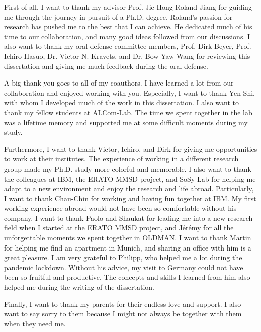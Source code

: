First of all, I want to thank my advisor Prof. Jie-Hong Roland Jiang for guiding me through the journey in pursuit of a Ph.D. degree.
Roland's passion for research has pushed me to the best that I can achieve.
He dedicated much of his time to our collaboration, and many good ideas followed from our discussions.
I also want to thank my oral-defense committee members,
Prof. Dirk Beyer, Prof. Ichiro Hasuo, Dr. Victor N. Kravets, and Dr. Bow-Yaw Wang
for reviewing this dissertation and giving me much feedback during the oral defense.

A big thank you goes to all of my coauthors.
I have learned a lot from our collaboration and enjoyed working with you.
Especially, I want to thank Yen-Shi, with whom I developed much of the work in this dissertation.
I also want to thank my fellow students at ALCom-Lab.
The time we spent together in the lab was a lifetime memory and supported me at some difficult moments during my study.

Furthermore, I want to thank Victor, Ichiro, and Dirk for giving me opportunities to work at their institutes.
The experience of working in a different research group made my Ph.D. study more colorful and memorable.
I also want to thank the colleagues at IBM, the ERATO MMSD project, and SoSy-Lab
for helping me adapt to a new environment and enjoy the research and life abroad.
Particularly, I want to thank Chau-Chin for working and having fun together at IBM.
My first working experience abroad would not have been so comfortable without his company.
I want to thank Paolo and Shaukat for leading me into a new research field when I started at the ERATO MMSD project,
and J{\'e}r{\'e}my for all the unforgettable moments we spent together in OLDMAN.
I want to thank Martin for helping me find an apartment in Munich, and sharing an office with him is a great pleasure.
I am very grateful to Philipp, who helped me a lot during the pandemic lockdown.
Without his advice, my visit to Germany could not have been so fruitful and productive.
The concepts and skills I learned from him also helped me during the writing of the dissertation.

Finally, I want to thank my parents for their endless love and support.
I also want to say sorry to them because I might not always be together with them when they need me.